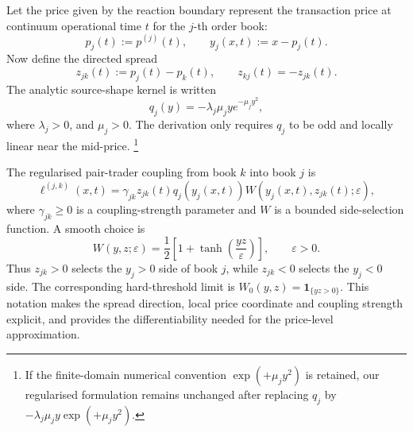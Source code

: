 \documentclass[5p,final]{elsarticle}
\begin{document}
Let the price given by the reaction boundary represent the transaction price at continuum operational time $t$ for the $j$-th order book:
\begin{equation}
    p_j(t):=p^{(j)}(t),\qquad
    y_j(x,t):=x-p_j(t).
\end{equation}
Now define the directed spread
\begin{equation}
    z_{jk}(t):=p_j(t)-p_k(t),
    \qquad z_{kj}(t)=-z_{jk}(t).
\end{equation}
The analytic source-shape kernel is written
\begin{equation}
    q_j(y)=-\lambda_j\mu_j ye^{-\mu_j y^2},
    \label{eq:qj-analytic}
\end{equation}
where $\lambda_j>0$, and $\mu_j>0$. The derivation only requires $q_j$ to be odd and locally linear near the mid-price. \footnote{If the finite-domain numerical convention $\exp(+\mu_jy^2)$ is retained, our regularised formulation remains unchanged after replacing $q_j$ by $-\lambda_j\mu_jy\exp(+\mu_jy^2)$.}

The regularised pair-trader coupling from book $k$ into book $j$ is
\begin{equation}
    \ell^{(j,k)}(x,t)
    =\gamma_{jk}z_{jk}(t)q_j\!\left(y_j(x,t)\right)
      W\!\left(y_j(x,t),z_{jk}(t);\varepsilon\right),
    \label{eq:regularised-coupling}
\end{equation}
where $\gamma_{jk}\geq0$ is a coupling-strength parameter and $W$ is a bounded side-selection function. A smooth choice \cite{OlssonKreiss2005,XiaoHonmaKono2005} is
\begin{equation}
    W(y,z;\varepsilon)
    =\frac{1}{2}\left[1+\tanh\!\left(\frac{yz}{\varepsilon}\right)\right],
    \qquad \varepsilon>0.
    \label{eq:side-selection-function}
\end{equation}
Thus $z_{jk}>0$ selects the $y_j>0$ side of book $j$, while $z_{jk}<0$ selects the $y_j<0$ side. The corresponding hard-threshold limit is $W_0(y,z)=\mathbf{1}_{\{yz>0\}}$. This notation makes the spread direction, local price coordinate and coupling strength explicit, and provides the differentiability needed for the price-level approximation.
\end{document}
